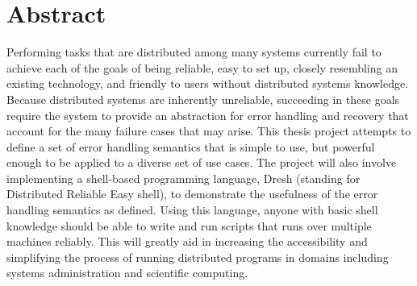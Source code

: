 \documentclass[twoside]{report}
\begin{document}



\tableofcontents
\listoffigures
\listoftables
\onehalfspacing

\chapter*{Abstract}

Performing tasks that are distributed among many systems currently fail to achieve each of the goals of being reliable, easy to set up, closely resembling an existing technology, and friendly to users without distributed systems knowledge.
Because distributed systems are inherently unreliable, succeeding in these goals require the system to provide an abstraction for error handling and recovery that account for the many failure cases that may arise.
This thesis project attempts to define a set of error handling semantics that is simple to use, but powerful enough to be applied to a diverse set of use cases.
The project will also involve implementing a shell-based programming language, Dresh (standing for Distributed Reliable Easy shell), to demonstrate the usefulness of the error handling semantics as defined.
Using this language, anyone with basic shell knowledge should be able to write and run scripts that runs over multiple machines reliably.
This will greatly aid in increasing the accessibility and simplifying the process of running distributed programs in domains including systems administration and scientific computing.
\end{document}
